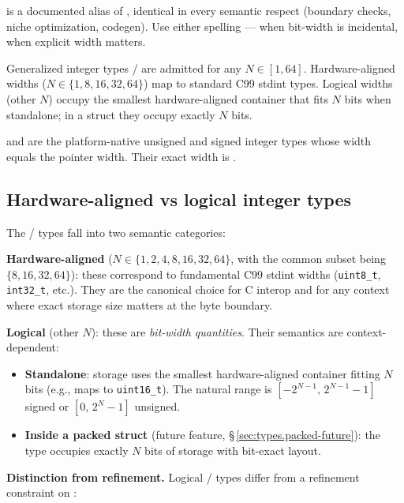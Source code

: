 \pnum
{} is a documented alias of , identical in every
semantic respect (boundary checks, niche optimization, codegen). Use
either spelling —  when bit-width is incidental, 
when explicit width matters.

\pnum
Generalized integer types / are admitted for any
$N \in [1, 64]$. Hardware-aligned widths
($N \in \{1, 8, 16, 32, 64\}$) map to standard C99 stdint types.
Logical widths (other $N$) occupy the smallest hardware-aligned
container that fits $N$ bits when standalone; in a \tok{[packed]}
struct they occupy exactly $N$ bits.

\pnum
{} and  are the platform-native unsigned and signed
integer types whose width equals the pointer width.  Their exact width is
.

\subsection{Hardware-aligned vs logical integer types}
\label{sec:types.iN-categories}

\pnum
The / types fall into two semantic categories:

\textbf{Hardware-aligned} (\(N \in \{1, 2, 4, 8, 16, 32, 64\}\), with
the common subset being \(\{8, 16, 32, 64\}\)): these correspond to
fundamental C99 stdint widths (\texttt{uint8\_t}, \texttt{int32\_t},
etc.). They are the canonical choice for C interop and for any context
where exact storage size matters at the byte boundary.

\textbf{Logical} (other \(N\)): these are \textit{bit-width quantities}.
Their semantics are context-dependent:

\begin{itemize}
  \item \textbf{Standalone}: storage uses the smallest hardware-aligned
        container fitting \(N\) bits (e.g.,  maps to
        \texttt{uint16\_t}). The natural range is
        \([-2^{N-1},\,2^{N-1}-1]\) signed or \([0,\,2^N-1]\) unsigned.
  \item \textbf{Inside a packed struct} (future feature,
        \S\,\ref{sec:types.packed-future}): the type occupies exactly
        \(N\) bits of storage with bit-exact layout.
\end{itemize}

\pnum
\textbf{Distinction from refinement.}  Logical / types
differ from a refinement constraint on :

